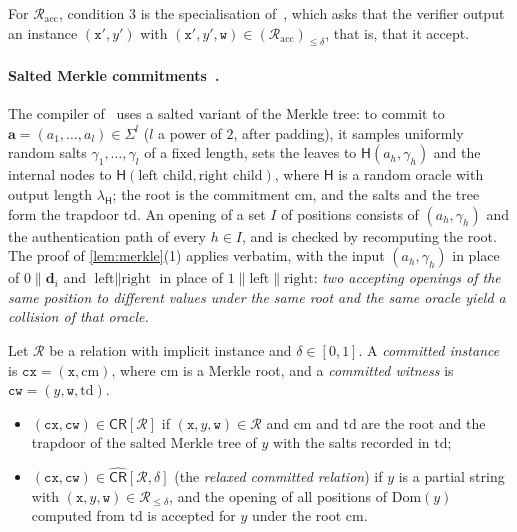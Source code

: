 For $\mathcal{R}_{\mathrm{acc}}$, condition 3 is the specialisation of~\cite[Definition~3.5]{CDHZ25}, which asks that the verifier output an instance $(\mathtt{x}', y')$ with $(\mathtt{x}', y', \mathtt{w}) \in (\mathcal{R}_{\mathrm{acc}})_{\le\delta}$, that is, that it accept.

\paragraph{Salted Merkle commitments~\cite[Definition~8.2]{CDHZ25}.}
The compiler of~\cite{CDHZ25} uses a salted variant of the Merkle tree: to commit to $\mathbf{a} = (a_1,\dots,a_l) \in \Sigma^{l}$ ($l$ a power of $2$, after padding), it samples uniformly random salts $\gamma_1,\dots,\gamma_l$ of a fixed length, sets the leaves to $\mathsf{H}(a_h, \gamma_h)$ and the internal nodes to $\mathsf{H}(\text{left child}, \text{right child})$, where $\mathsf{H}$ is a random oracle with output length $\lambda_{\mathsf{H}}$; the root is the commitment $\mathrm{cm}$, and the salts and the tree form the trapdoor $\mathrm{td}$.
An opening of a set $I$ of positions consists of $(a_h, \gamma_h)$ and the authentication path of every $h \in I$, and is checked by recomputing the root.
The proof of \cref{lem:merkle}(1) applies verbatim, with the input $(a_h, \gamma_h)$ in place of $0 \| \mathbf{d}_i$ and $\text{left}\|\text{right}$ in place of $1\|\text{left}\|\text{right}$: \emph{two accepting openings of the same position to different values under the same root and the same oracle yield a collision of that oracle.}

\begin{definition}\label{def:committed}
Let $\mathcal{R}$ be a relation with implicit instance and $\delta \in [0,1]$.
A \emph{committed instance} is $\mathtt{cx} = (\mathtt{x}, \mathrm{cm})$, where $\mathrm{cm}$ is a Merkle root, and a \emph{committed witness} is $\mathtt{cw} = (y, \mathtt{w}, \mathrm{td})$.
\begin{itemize}
  \item $(\mathtt{cx}, \mathtt{cw}) \in \mathsf{CR}[\mathcal{R}]$ if $(\mathtt{x}, y, \mathtt{w}) \in \mathcal{R}$ and $\mathrm{cm}$ and $\mathrm{td}$ are the root and the trapdoor of the salted Merkle tree of $y$ with the salts recorded in $\mathrm{td}$;
  \item $(\mathtt{cx}, \mathtt{cw}) \in \widehat{\mathsf{CR}}[\mathcal{R}, \delta]$ (the \emph{relaxed committed relation}) if $y$ is a partial string with $(\mathtt{x}, y, \mathtt{w}) \in \mathcal{R}_{\le\delta}$, and the opening of all positions of $\mathrm{Dom}(y)$ computed from $\mathrm{td}$ is accepted for $y$ under the root $\mathrm{cm}$.
\end{itemize}
\end{definition}


